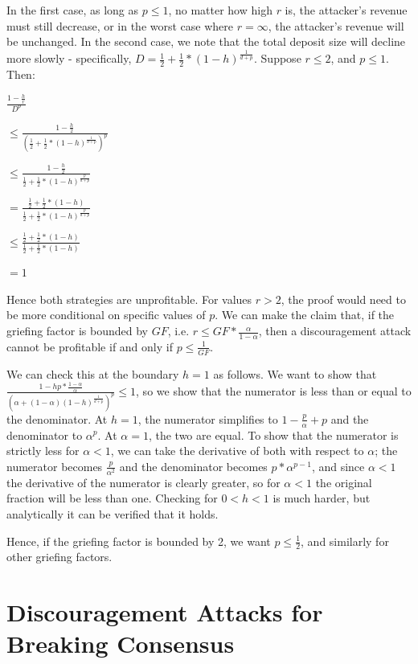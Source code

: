 \documentclass[12pt]{article}
\begin{document}
In the first case, as long as $p \le 1$, no matter how high $r$ is, the attacker's revenue must still decrease, or in the worst case where $r = \infty$, the attacker's revenue will be unchanged. In the second case, we note that the total deposit size will decline more slowly - specifically, $D = \frac{1}{2} + \frac{1}{2} * (1-h)^{\frac{1}{d+p}}$. Suppose $r \le 2$, and $p \le 1$. Then:

$\frac{1-\frac{h}{r}}{D^p}$

$ \le \frac{1-\frac{h}{2}}{(\frac{1}{2} + \frac{1}{2} * (1-h)^{\frac{1}{d+p}})^p}$

$ \le \frac{1-\frac{h}{2}}{\frac{1}{2} + \frac{1}{2} * (1-h)^{\frac{p}{d+p}}}$

$ = \frac{\frac{1}{2} + \frac{1}{2} * (1-h)}{\frac{1}{2} + \frac{1}{2} * (1-h)^{\frac{p}{d+p}}}$

$ \le \frac{\frac{1}{2} + \frac{1}{2} * (1-h)}{\frac{1}{2} + \frac{1}{2} * (1-h)}$

$ = 1$

Hence both strategies are unprofitable. For values $r > 2$, the proof would need to be more conditional on specific values of $p$. We can make the claim that, if the griefing factor is bounded by $GF$, i.e. $r \le GF * \frac{\alpha}{1-\alpha}$, then a discouragement attack cannot be profitable if and only if $p \le \frac{1}{GF}$.

We can check this at the boundary $h = 1$ as follows. We want to show that $\frac{1 - hp * \frac{1-\alpha}{\alpha}}{(\alpha + (1-\alpha)(1-h)^{\frac{1}{d+p}})^p} \le 1$, so we show that the numerator is less than or equal to the denominator. At $h = 1$, the numerator simplifies to $1 - \frac{p}{\alpha} + p$ and the denominator to $\alpha^p$. At $\alpha=1$, the two are equal. To show that the numerator is strictly less for $\alpha<1$, we can take the derivative of both with respect to $\alpha$; the numerator becomes $\frac{p}{\alpha^2}$ and the denominator becomes $p * \alpha^{p-1}$, and since $\alpha < 1$ the derivative of the numerator is clearly greater, so for $\alpha < 1$ the original fraction will be less than one. Checking for $0 < h < 1$ is much harder, but analytically it can be verified that it holds.

Hence, if the griefing factor is bounded by 2, we want $p \le \frac{1}{2}$, and similarly for other griefing factors.


\section{Discouragement Attacks for Breaking Consensus}
\end{document}

